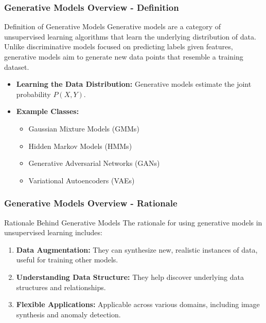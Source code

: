 \documentclass[aspectratio=169]{beamer}
\begin{document}
\begin{frame}[fragile]
    \frametitle{Generative Models Overview - Definition}
    
    \begin{block}{Definition of Generative Models}
        Generative models are a category of unsupervised learning algorithms that learn the underlying distribution of data. Unlike discriminative models focused on predicting labels given features, generative models aim to generate new data points that resemble a training dataset.
    \end{block}
    
    \begin{itemize}
        \item \textbf{Learning the Data Distribution:} Generative models estimate the joint probability \( P(X, Y) \).
        \item \textbf{Example Classes:}
        \begin{itemize}
            \item Gaussian Mixture Models (GMMs)
            \item Hidden Markov Models (HMMs)
            \item Generative Adversarial Networks (GANs)
            \item Variational Autoencoders (VAEs)
        \end{itemize}
    \end{itemize}
\end{frame}

\begin{frame}[fragile]
    \frametitle{Generative Models Overview - Rationale}
    
    \begin{block}{Rationale Behind Generative Models}
        The rationale for using generative models in unsupervised learning includes:
    \end{block}
    
    \begin{enumerate}
        \item \textbf{Data Augmentation:} They can synthesize new, realistic instances of data, useful for training other models.
        \item \textbf{Understanding Data Structure:} They help discover underlying data structures and relationships.
        \item \textbf{Flexible Applications:} Applicable across various domains, including image synthesis and anomaly detection.
    \end{enumerate}
\end{frame}
\end{document}
